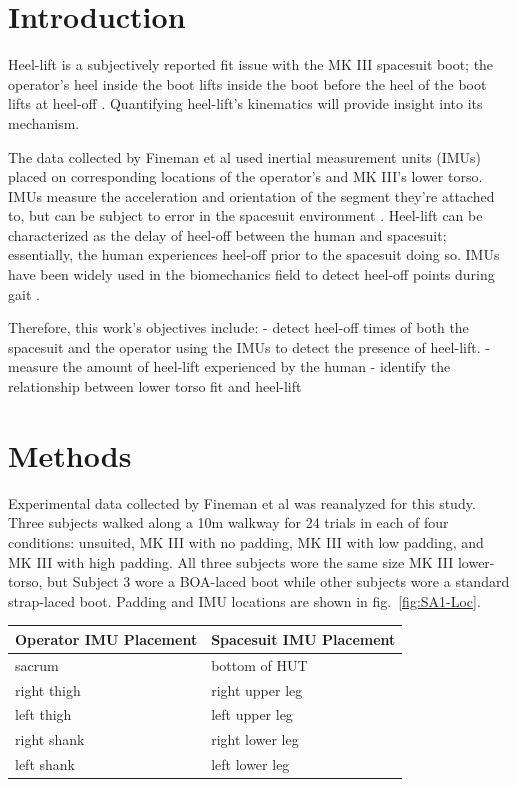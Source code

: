 \documentclass[defaultstyle,11pt]{comps}
\begin{document}
\hypertarget{introduction}{%
\section{Introduction}\label{introduction}}

Heel-lift is a subjectively reported fit issue with the MK III spacesuit boot; the operator's heel inside the boot lifts inside the boot before the heel of the boot lifts at heel-off \citep{Fineman2018}.
Quantifying heel-lift's kinematics will provide insight into its mechanism.

The data collected by Fineman et al \citep{Fineman2018} used inertial measurement units (IMUs) placed on corresponding locations of the operator's and MK III's lower torso.
IMUs measure the acceleration and orientation of the segment they're attached to, but can be subject to error in the spacesuit environment \citep{Bertrand2016, Shen2019, Shen2020}.
Heel-lift can be characterized as the delay of heel-off between the human and spacesuit; essentially, the human experiences heel-off prior to the spacesuit doing so.
IMUs have been widely used in the biomechanics field to detect heel-off points during gait \citep{Rebula2013, Fischer2013}.

Therefore, this work's objectives include:
- detect heel-off times of both the spacesuit and the operator using the IMUs to detect the presence of heel-lift.
- measure the amount of heel-lift experienced by the human
- identify the relationship between lower torso fit and heel-lift

\hypertarget{methods}{%
\section{Methods}\label{methods}}

Experimental data collected by Fineman et al \citep{Fineman2018} was reanalyzed for this study.
Three subjects walked along a 10m walkway for 24 trials in each of four conditions: unsuited, MK III with no padding, MK III with low padding, and MK III with high padding.
All three subjects wore the same size MK III lower-torso, but Subject 3 wore a BOA-laced boot while other subjects wore a standard strap-laced boot.
Padding and IMU locations are shown in fig.~\ref{fig:SA1-Loc}.

\begin{longtable}[]{@{}ll@{}}
\toprule
Operator IMU Placement & Spacesuit IMU Placement\tabularnewline
\midrule
\endhead
sacrum & bottom of HUT\tabularnewline
right thigh & right upper leg\tabularnewline
left thigh & left upper leg\tabularnewline
right shank & right lower leg\tabularnewline
left shank & left lower leg\tabularnewline
\bottomrule
\end{longtable}
\end{document}
